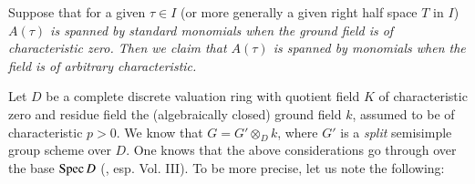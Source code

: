 \begin{remark}\label{art18-rem5}
Suppose that for a given $\tau \in I$ (or more generally a given right half space $T$ in $I$) {\em $A(\tau)$ is spanned by standard monomials when the ground field is of characteristic zero. Then we claim that $A(\tau)$ is spanned by monomials when the field is of arbitrary characteristic.}
\end{remark}

Let $D$ be a complete discrete valuation ring with quotient field $K$ of characteristic zero and residue field the (algebraically closed) ground field $k$, assumed to be of characteristic $p>0$. We know that $G = G' \otimes_D k$, where $G'$ is a {\em split} semisimple group scheme over $D$. One knows that the above considerations go through over the base $\operatorname{Spec} D$ (\cf \cite{art18-key15}, esp. Vol. III). To be more precise, let us note the following:
